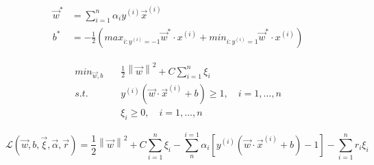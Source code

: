 \documentclass[letterpaper,11pt]{article}
\numberwithin{equation}{section}
\begin{document}
\begin{equation}
    \begin{aligned}
        \vec{w}^{*} & =\sum_{i=1}^{n}\alpha_iy^{(i)}\vec{x}^{(i)}                                                               \\
        b^*         & =- \frac{1}{2} (max_{i:y^{(i)}=-1}\vec{w}^{*} \cdot x^{(i)} + min_{i:y^{(i)}=1}\vec{w}^{*} \cdot x^{(i)})
    \end{aligned}
\end{equation}

\begin{equation}
    \begin{aligned}
        min_{\vec{w},b} \quad & \frac{1}{2} {\left \| \vec{w} \right \|}^2 + C \sum_{i=1}^{n} \xi_i \\
        s.t. \quad            & y^{(i)}(\vec{w} \cdot \vec{x}^{(i)} + b) \ge 1, \quad i=1,\dots,n   \\
                              & \xi_i \ge 0, \quad i=1,\dots,n
    \end{aligned}
\end{equation}

\begin{equation}
    \mathcal{L}(\vec{w},b,\vec{\xi},\vec{\alpha},\vec{r})=\frac{1}{2} {\left \| \vec{w} \right \|}^2 + C \sum_{i=1}^{n} \xi_i -\sum_{n}^{i=1}\alpha_i \left[ y^{(i)}(\vec{w} \cdot \vec{x}^{(i)} + b)-1 \right] - \sum_{i=1}^{n} r_i \xi_i
    \label{eq:lagrange-soft-margin}
\end{equation}
\end{document}
